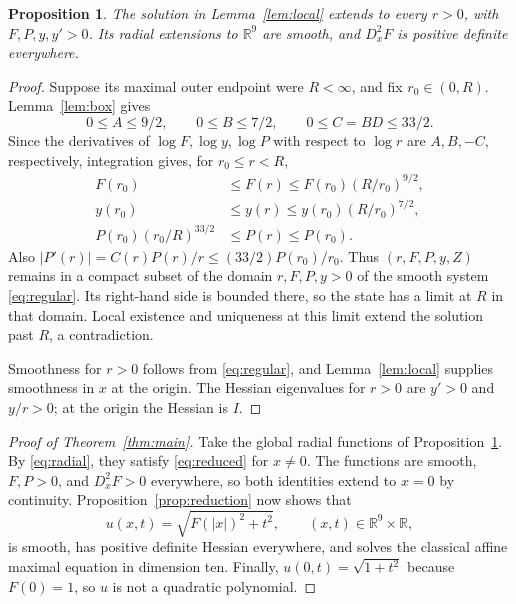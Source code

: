 \documentclass[11pt]{article}
\newcommand{\R}{\mathbb R}
\newtheorem{proposition}[theorem]{Proposition}
\theoremstyle{remark}
\begin{document}
\begin{proposition}\label{prop:global}
The solution in Lemma~\ref{lem:local} extends to every $r>0$,
with $F,P,y,y'>0$.  Its radial extensions to $\R^9$ are smooth,
and $D_x^2F$ is positive definite everywhere.
\end{proposition}
\begin{proof}
Suppose its maximal outer endpoint were $R<\infty$, and fix
$r_0\in(0,R)$.  Lemma~\ref{lem:box} gives
\[
 0\leq A\leq9/2,\qquad 0\leq B\leq7/2,
 \qquad 0\leq C=BD\leq33/2.
\]
Since the derivatives of $\log F,\log y,\log P$ with respect
to $\log r$ are $A,B,-C$, respectively, integration gives,
for $r_0\leq r<R$,
\begin{align*}
 F(r_0)&\leq F(r)\leq F(r_0)(R/r_0)^{9/2},\\
 y(r_0)&\leq y(r)\leq y(r_0)(R/r_0)^{7/2},\\
 P(r_0)(r_0/R)^{33/2}&\leq P(r)\leq P(r_0).
\end{align*}
Also $|P'(r)|=C(r)P(r)/r\leq(33/2)P(r_0)/r_0$.
Thus $(r,F,P,y,Z)$ remains in a compact subset of the domain
$r,F,P,y>0$ of the smooth system \eqref{eq:regular}.
Its right-hand side is bounded there, so the state has a limit
at $R$ in that domain.  Local existence and uniqueness at this
limit extend the solution past $R$, a contradiction.

Smoothness for $r>0$ follows from \eqref{eq:regular}, and
Lemma~\ref{lem:local} supplies smoothness in $x$ at the origin.
The Hessian eigenvalues for $r>0$ are $y'>0$ and $y/r>0$;
at the origin the Hessian is $I$.
\end{proof}

\begin{proof}[Proof of Theorem~\ref{thm:main}]
Take the global radial functions of Proposition~\ref{prop:global}.
By \eqref{eq:radial}, they satisfy \eqref{eq:reduced} for $x\ne0$.
The functions are smooth, $F,P>0$, and $D_x^2F>0$ everywhere,
so both identities extend to $x=0$ by continuity.
Proposition~\ref{prop:reduction} now shows that
\[
 u(x,t)=\sqrt{F(|x|)^2+t^2},\qquad (x,t)\in\R^9\times\R,
\]
is smooth, has positive definite Hessian everywhere, and solves
the classical affine maximal equation in dimension ten.
Finally, $u(0,t)=\sqrt{1+t^2}$ because $F(0)=1$,
so $u$ is not a quadratic polynomial.
\end{proof}

{\small


}
\end{document}
